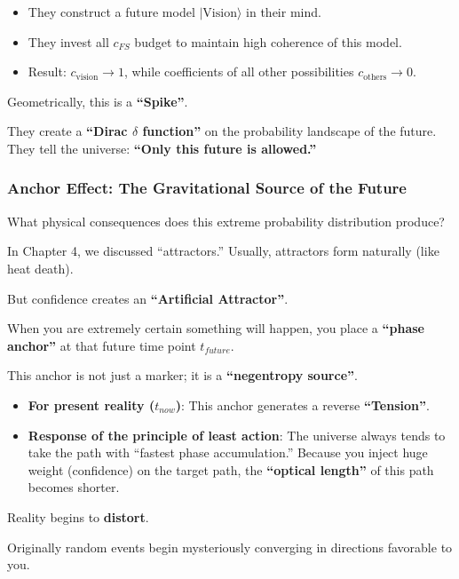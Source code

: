 \begin{itemize}
\item They construct a future model $|\text{Vision}\rangle$ in their mind.

\item They invest all $c_{FS}$ budget to maintain high coherence of this model.

\item Result: $c_{\text{vision}} \to 1$, while coefficients of all other possibilities $c_{\text{others}} \to 0$.
\end{itemize}

Geometrically, this is a \textbf{``Spike''}.

They create a \textbf{``Dirac $\delta$ function''} on the probability landscape of the future. They tell the universe: \textbf{``Only this future is allowed.''}

\subsubsection{Anchor Effect: The Gravitational Source of the Future}

What physical consequences does this extreme probability distribution produce?

In Chapter 4, we discussed ``attractors.'' Usually, attractors form naturally (like heat death).

But confidence creates an \textbf{``Artificial Attractor''}.

When you are extremely certain something will happen, you place a \textbf{``phase anchor''} at that future time point $t_{future}$.

This anchor is not just a marker; it is a \textbf{``negentropy source''}.

\begin{itemize}
\item \textbf{For present reality ($t_{now}$)}: This anchor generates a reverse \textbf{``Tension''}.

\item \textbf{Response of the principle of least action}: The universe always tends to take the path with ``fastest phase accumulation.'' Because you inject huge weight (confidence) on the target path, the \textbf{``optical length''} of this path becomes shorter.
\end{itemize}

Reality begins to \textbf{distort}.

Originally random events begin mysteriously converging in directions favorable to you.

